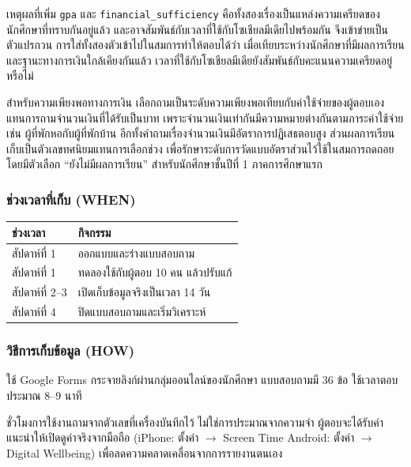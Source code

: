 เหตุผลที่เพิ่ม \texttt{gpa} และ \texttt{financial\_sufficiency}
คือทั้งสองเรื่องเป็นแหล่งความเครียดของนักศึกษาที่ทราบกันอยู่แล้ว
และอาจสัมพันธ์กับเวลาที่ใช้กับโซเชียลมีเดียไปพร้อมกัน จึงเข้าข่ายเป็นตัวแปรกวน
การใส่ทั้งสองตัวเข้าไปในสมการทำให้ตอบได้ว่า
เมื่อเทียบระหว่างนักศึกษาที่มีผลการเรียนและฐานะทางการเงินใกล้เคียงกันแล้ว
เวลาที่ใช้กับโซเชียลมีเดียยังสัมพันธ์กับคะแนนความเครียดอยู่หรือไม่

สำหรับความเพียงพอทางการเงิน เลือกถามเป็นระดับความเพียงพอเทียบกับค่าใช้จ่ายของผู้ตอบเอง
แทนการถามจำนวนเงินที่ได้รับเป็นบาท เพราะจำนวนเงินเท่ากันมีความหมายต่างกันตามภาระค่าใช้จ่าย
เช่น ผู้ที่พักหอกับผู้ที่พักบ้าน อีกทั้งคำถามเรื่องจำนวนเงินมีอัตราการปฏิเสธตอบสูง
ส่วนผลการเรียนเก็บเป็นตัวเลขทศนิยมแทนการเลือกช่วง เพื่อรักษาระดับการวัดแบบอัตราส่วนไว้ใช้ในสมการถดถอย
โดยมีตัวเลือก ``ยังไม่มีผลการเรียน'' สำหรับนักศึกษาชั้นปีที่ 1 ภาคการศึกษาแรก

\subsubsection*{ช่วงเวลาที่เก็บ (WHEN)}

\begin{table}[H]
\centering
\begin{tabular}{|l|l|}
\hline
\textbf{ช่วงเวลา} & \textbf{กิจกรรม} \\
\hline
สัปดาห์ที่ 1 & ออกแบบและร่างแบบสอบถาม \\
\hline
สัปดาห์ที่ 1 & ทดลองใช้กับผู้ตอบ 10 คน แล้วปรับแก้ \\
\hline
สัปดาห์ที่ 2--3 & เปิดเก็บข้อมูลจริงเป็นเวลา 14 วัน \\
\hline
สัปดาห์ที่ 4 & ปิดแบบสอบถามและเริ่มวิเคราะห์ \\
\hline
\end{tabular}
\end{table}

\subsubsection*{วิธีการเก็บข้อมูล (HOW)}

ใช้ Google Forms กระจายลิงก์ผ่านกลุ่มออนไลน์ของนักศึกษา
แบบสอบถามมี 36 ข้อ ใช้เวลาตอบประมาณ 8--9 นาที

ชั่วโมงการใช้งานถามจากตัวเลขที่เครื่องบันทึกไว้ ไม่ใช่การประมาณจากความจำ
ผู้ตอบจะได้รับคำแนะนำให้เปิดดูค่าจริงจากมือถือ
(iPhone: ตั้งค่า $\rightarrow$ Screen Time \quad Android: ตั้งค่า $\rightarrow$ Digital Wellbeing)
เพื่อลดความคลาดเคลื่อนจากการรายงานตนเอง

